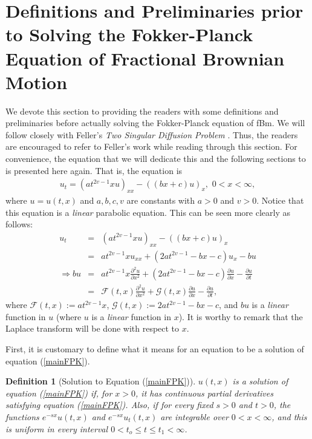 \documentclass[preprint, 12pt]{elsarticle}
\numberwithin{equation}{section}
\theoremstyle{plain}
\newtheorem{definition}{Definition}[section]
\theoremstyle{remark}
\newcommand{\assign}{:=}
\begin{document}
\section{Definitions and Preliminaries prior to Solving the Fokker-Planck Equation of Fractional Brownian Motion}\label{somedef}
We devote this section to providing the readers with some definitions and preliminaries before actually solving the Fokker-Planck equation of fBm. We will follow closely with Feller's \textit{Two Singular Diffusion Problem} \citep{Feller}. Thus, the readers are encouraged to refer to Feller's work while reading through this section. For convenience, the equation that we will dedicate this and the following sections to is presented here again. That is, the equation is
\begin{eqnarray}\label{mainFPK}
u_t = (a t^{2 v - 1} x u)_{x x} - ((b x + c) u)_x, \,\, 0 < x < \infty, 
\end{eqnarray}
where $u = u (t, x)$ and $a, b, c, v$ are constants with $a>0$ and $v > 0$. Notice that this equation is a \textit{linear} parabolic equation. This can be seen more clearly as follows:
\begin{eqnarray*}
u_t & = & (a t^{2 v - 1} x u)_{x x} - ((b x + c) u)_x\\ 
& = & a t^{2 v - 1} x u_{x x} + (2 a t^{2 v - 1} - b x - c) u_x - b u\\
\Longrightarrow b u & = & a t^{2 v - 1} x \frac{\partial^2 u}{\partial x^2} + (2 a t^{2 v - 1} - b x - c) \frac{\partial u}{\partial x} - \frac{\partial u}{\partial t}\\ 
& = & \mathcal{F} (t, x) \frac{\partial^2 u}{\partial x^2} +\mathcal{G} (t, x) \frac{\partial u}{\partial x} - \frac{\partial u}{\partial t},
\end{eqnarray*}
where $\displaystyle{\mathcal{F} (t, x) \assign a t^{2 v - 1} x}$, $\displaystyle{\mathcal{G} (t, x) \assign 2 a t^{2 v - 1} - b x - c}$, and $b u$ is a \emph{linear} function in $u$ (where $u$ is a \emph{linear} function in $x$). It is worthy to remark that the Laplace transform will be done with respect to $x$.

First, it is customary to define what it means for an equation to be a
solution of equation (\ref{mainFPK}).

\begin{definition}[Solution to Equation
(\ref{mainFPK})]
$u (t, x)$ is a solution of equation (\ref{mainFPK}) if, for $x > 0$, it has continuous partial derivatives satisfying equation (\ref{mainFPK}). Also, if for every fixed $s > 0$ and $t > 0$, the functions $e^{- s x} u (t, x)$ and $e^{- s x} u_t (t, x)$ are integrable over $0 < x < \infty$, and this is uniform in every interval $0 < t_o \leqslant t \leqslant t_1 < \infty$.
\end{definition}
\end{document}
